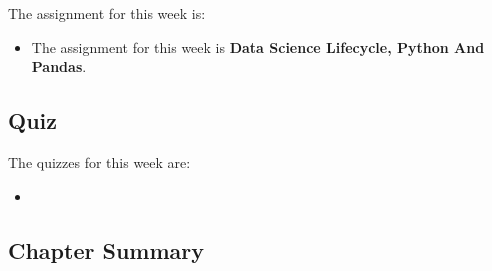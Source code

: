 The assignment for this week is:

\begin{itemize}
    \item The assignment for this week is \textbf{Data Science Lifecycle, Python And Pandas}. 
\end{itemize}

\subsection{Quiz}

The quizzes for this week are:

\begin{itemize}
    \item {} \textbullet {} 
\end{itemize}

\subsection{Chapter Summary}
